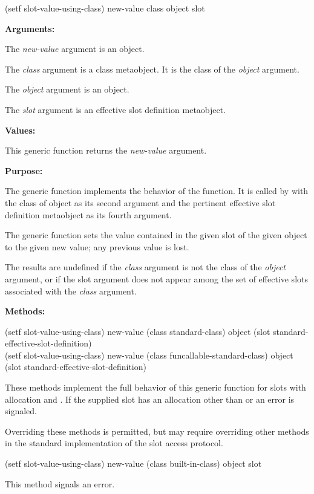 \begin{defun}
(setf slot-value-using-class) new-value class object slot

\textbf{Arguments:}

The \emph{new-value} argument is an object.

The \emph{class} argument is a class metaobject. It is the class of the
\emph{object} argument.

The \emph{object} argument is an object.

The \emph{slot} argument is an effective slot definition metaobject.

\textbf{Values:}

This generic function returns the \emph{new-value} argument.

\textbf{Purpose:}

The generic function  implements the behavior
of the  function. It is called by 
with the class of object as its second argument and the pertinent effective slot
definition metaobject as its fourth argument.

The generic function  sets the value contained in
the given slot of the given object to the given new value; any previous value is
lost.

The results are undefined if the \emph{class} argument is not the class of the
\emph{object} argument, or if the slot argument does not appear among the set of
effective slots associated with the \emph{class} argument.

\textbf{Methods:}

\begin{defun}
(setf slot-value-using-class) new-value (class standard-class) object (slot
    standard-effective-slot-definition) \\
(setf slot-value-using-class) new-value (class funcallable-standard-class)
    object (slot standard-effective-slot-definition)

These methods implement the full behavior of this generic function for slots
with allocation  and . If the supplied slot has an allocation
other than  or  an error is signaled.

Overriding these methods is permitted, but may require overriding other methods
in the standard implementation of the slot access protocol.
\end{defun}

\begin{defun}
(setf slot-value-using-class) new-value (class built-in-class) object slot

This method signals an error.
\end{defun}
\end{defun}

